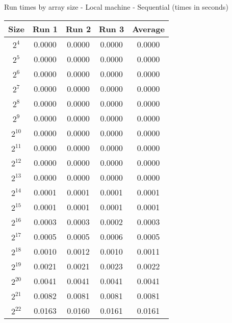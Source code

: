 \centering
\caption{Run times by array size - Local machine - Sequential (times in seconds)}
\begin{tabular}{@{} c c c c c @{}}
\toprule
    \textbf{Size} & \textbf{Run 1}& \textbf{Run 2}& \textbf{Run 3}& \textbf{Average}\\
\midrule
    $2^4$ & 0.0000 & 0.0000 & 0.0000 & 0.0000\\
\lightrule
    $2^5$ & 0.0000 & 0.0000 & 0.0000 & 0.0000\\
\lightrule
    $2^6$ & 0.0000 & 0.0000 & 0.0000 & 0.0000\\
\lightrule
    $2^7$ & 0.0000 & 0.0000 & 0.0000 & 0.0000\\
\lightrule
    $2^8$ & 0.0000 & 0.0000 & 0.0000 & 0.0000\\
\lightrule
    $2^9$ & 0.0000 & 0.0000 & 0.0000 & 0.0000\\
\lightrule
    $2^{10}$ & 0.0000 & 0.0000 & 0.0000 & 0.0000\\
\lightrule
    $2^{11}$ & 0.0000 & 0.0000 & 0.0000 & 0.0000\\
\lightrule
    $2^{12}$ & 0.0000 & 0.0000 & 0.0000 & 0.0000\\
\lightrule
    $2^{13}$ & 0.0000 & 0.0000 & 0.0000 & 0.0000\\
\lightrule
    $2^{14}$ & 0.0001 & 0.0001 & 0.0001 & 0.0001\\
\lightrule
    $2^{15}$ & 0.0001 & 0.0001 & 0.0001 & 0.0001\\
\lightrule
    $2^{16}$ & 0.0003 & 0.0003 & 0.0002 & 0.0003\\
\lightrule
    $2^{17}$ & 0.0005 & 0.0005 & 0.0006 & 0.0005\\
\lightrule
    $2^{18}$ & 0.0010 & 0.0012 & 0.0010 & 0.0011\\
\lightrule
    $2^{19}$ & 0.0021 & 0.0021 & 0.0023 & 0.0022\\
\lightrule
    $2^{20}$ & 0.0041 & 0.0041 & 0.0041 & 0.0041\\
\lightrule
    $2^{21}$ & 0.0082 & 0.0081 & 0.0081 & 0.0081\\
\lightrule
    $2^{22}$ & 0.0163 & 0.0160 & 0.0161 & 0.0161\\
\bottomrule
\end{tabular}
\label{table:array_seq_local}
